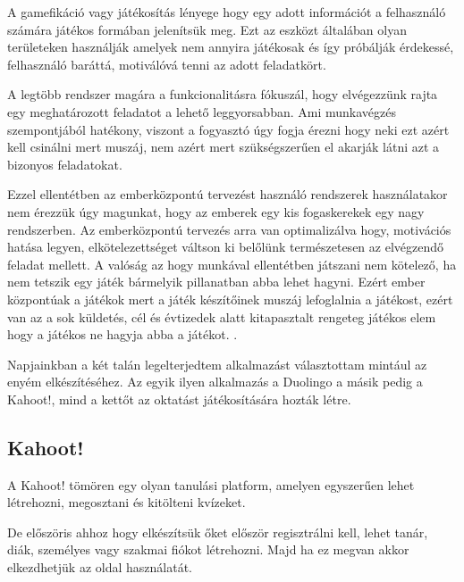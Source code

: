 

A gamefikáció vagy játékosítás lényege hogy egy adott információt a felhasználó számára játékos formában jelenítsük meg. Ezt az eszközt általában olyan területeken használják amelyek nem annyira játékosak és így próbálják érdekessé, felhasználó baráttá, motiválóvá tenni az adott feladatkört. \vspace{5mm}

A legtöbb rendszer magára a funkcionalitásra fókuszál, hogy elvégezzünk rajta egy meghatározott feladatot a lehető leggyorsabban. Ami munkavégzés szempontjából hatékony, viszont a fogyasztó úgy fogja érezni hogy neki ezt azért kell csinálni mert muszáj, nem azért mert szükségszerűen el akarják látni azt a bizonyos feladatokat.\vspace{5mm}

Ezzel ellentétben az emberközpontú tervezést használó rendszerek használatakor nem érezzük úgy magunkat, hogy az emberek egy kis fogaskerekek egy nagy rendszerben. Az emberközpontú tervezés arra van optimalizálva hogy, motivációs hatása legyen, elkötelezettséget váltson ki belőlünk természetesen az elvégzendő feladat mellett. A valóság az hogy munkával ellentétben játszani nem kötelező, ha nem tetszik egy játék bármelyik pillanatban abba lehet hagyni. Ezért ember központúak a játékok mert a játék készítőinek muszáj lefoglalnia a játékost, ezért van az a sok küldetés, cél és évtizedek alatt kitapasztalt rengeteg játékos elem hogy a játékos ne hagyja abba a játékot. \cite{actionablegamification}.


Napjainkban a két talán legelterjedtem alkalmazást választottam mintául az enyém elkészítéséhez. Az egyik ilyen alkalmazás a Duolingo\cite{duolingo} a másik pedig a Kahoot!\cite{kahoot}, mind a kettőt az oktatást játékosítására hozták létre. \vspace{5mm}

\subsection{Kahoot!}

A Kahoot! tömören egy olyan tanulási platform, amelyen egyszerűen lehet létrehozni, megosztani és kitölteni kvízeket.

De előszöris ahhoz hogy elkészítsük őket először regisztrálni kell, lehet tanár, diák, személyes vagy szakmai fiókot létrehozni. Majd ha ez megvan akkor elkezdhetjük az oldal használatát.

